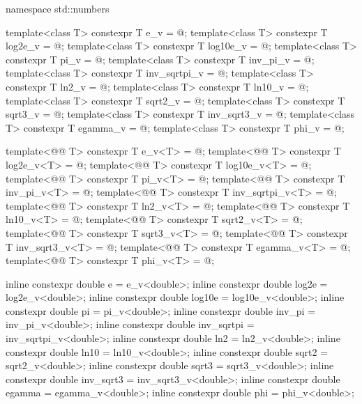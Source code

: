 %
\begin{codeblock}
namespace std::numbers {
  template<class T> constexpr T e_v          = @\unspec@;
  template<class T> constexpr T log2e_v      = @\unspec@;
  template<class T> constexpr T log10e_v     = @\unspec@;
  template<class T> constexpr T pi_v         = @\unspec@;
  template<class T> constexpr T inv_pi_v     = @\unspec@;
  template<class T> constexpr T inv_sqrtpi_v = @\unspec@;
  template<class T> constexpr T ln2_v        = @\unspec@;
  template<class T> constexpr T ln10_v       = @\unspec@;
  template<class T> constexpr T sqrt2_v      = @\unspec@;
  template<class T> constexpr T sqrt3_v      = @\unspec@;
  template<class T> constexpr T inv_sqrt3_v  = @\unspec@;
  template<class T> constexpr T egamma_v     = @\unspec@;
  template<class T> constexpr T phi_v        = @\unspec@;

  template<@@ T> constexpr T e_v<T>          = @\seebelow@;
  template<@@ T> constexpr T log2e_v<T>      = @\seebelow@;
  template<@@ T> constexpr T log10e_v<T>     = @\seebelow@;
  template<@@ T> constexpr T pi_v<T>         = @\seebelow@;
  template<@@ T> constexpr T inv_pi_v<T>     = @\seebelow@;
  template<@@ T> constexpr T inv_sqrtpi_v<T> = @\seebelow@;
  template<@@ T> constexpr T ln2_v<T>        = @\seebelow@;
  template<@@ T> constexpr T ln10_v<T>       = @\seebelow@;
  template<@@ T> constexpr T sqrt2_v<T>      = @\seebelow@;
  template<@@ T> constexpr T sqrt3_v<T>      = @\seebelow@;
  template<@@ T> constexpr T inv_sqrt3_v<T>  = @\seebelow@;
  template<@@ T> constexpr T egamma_v<T>     = @\seebelow@;
  template<@@ T> constexpr T phi_v<T>        = @\seebelow@;

  inline constexpr double e          = e_v<double>;
  inline constexpr double log2e      = log2e_v<double>;
  inline constexpr double log10e     = log10e_v<double>;
  inline constexpr double pi         = pi_v<double>;
  inline constexpr double inv_pi     = inv_pi_v<double>;
  inline constexpr double inv_sqrtpi = inv_sqrtpi_v<double>;
  inline constexpr double ln2        = ln2_v<double>;
  inline constexpr double ln10       = ln10_v<double>;
  inline constexpr double sqrt2      = sqrt2_v<double>;
  inline constexpr double sqrt3      = sqrt3_v<double>;
  inline constexpr double inv_sqrt3  = inv_sqrt3_v<double>;
  inline constexpr double egamma     = egamma_v<double>;
  inline constexpr double phi        = phi_v<double>;
}
\end{codeblock}

